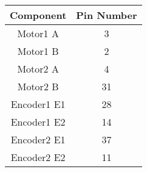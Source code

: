 \begin{center}
    \begin{tabularx}{0.355\linewidth}{|c|c|}
        \hline
        \textbf{Component} & \textbf{Pin Number} \\
        \hline
        Motor1 A           & 3                   \\
        Motor1 B           & 2                   \\
        Motor2 A           & 4                   \\
        Motor2 B           & 31                  \\
        \hline
        Encoder1 E1        & 28                  \\
        Encoder1 E2        & 14                  \\
        Encoder2 E1        & 37                  \\
        Encoder2 E2        & 11                  \\
        \hline
    \end{tabularx}
\end{center}
